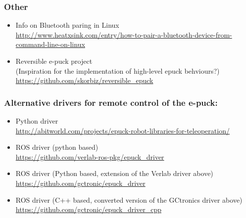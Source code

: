 \documentclass{article}
\DeclareRobustCommand{\gobblefour}[5]{} %
\newcommand*{\SkipTocEntry}{\addtocontents{toc}{\gobblefour}}
\begin{document}
\SkipTocEntry
\subsubsection{Other}
\label{sec:link:other}
\begin{itemize}
\item Info on Bluetooth paring in Linux 
\\ \url{http://www.heatxsink.com/entry/how-to-pair-a-bluetooth-device-from-command-line-on-linux}
\item Reversible e-puck project \\(Inspiration for the implementation of high-level epuck behviours?)
\\ \url{https://github.com/skorbiz/reversible_epuck} 
\end{itemize}


\SkipTocEntry
\subsubsection{Alternative drivers for remote control of the e-puck:}
\label{sec:link:altdrivers}
\begin{itemize}
\item Python driver
\\ \url{http://abitworld.com/projects/epuck-robot-libraries-for-teleoperation/}
\item ROS driver (python based)
\\ \url{https://github.com/verlab-ros-pkg/epuck_driver}
\item ROS driver (Python based, extension of the Verlab driver above)
\\ \url{https://github.com/gctronic/epuck_driver}
\item ROS driver (C++ based, converted version of the GCtronics driver above)
\\ \url{https://github.com/gctronic/epuck_driver_cpp}
\end{itemize}
\end{document}
